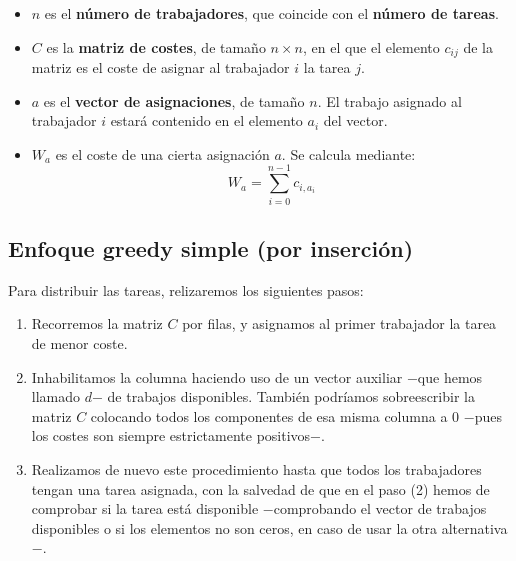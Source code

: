 \documentclass[10pt, a4paper]{article}
\theoremstyle{theorem-style}
\theoremstyle{theorem-style}
\theoremstyle{definition-style}
\theoremstyle{remark-style}
\theoremstyle{example-style}
\theoremstyle{definition-style}
\theoremstyle{remark-style}
\begin{document}
\begin{itemize}
	\item $n$ es el \textbf{número de trabajadores}, que coincide con el \textbf{número de tareas}.
	\item $C$ es la \textbf{matriz de costes}, de tamaño $n\times n$, en el que el elemento $c_{ij}$ de la matriz es el coste de asignar al trabajador $i$ la tarea $j$.
	\item $a$ es el \textbf{vector de asignaciones}, de tamaño $n$. El trabajo asignado al trabajador $i$ estará contenido en el elemento $a_i$ del vector.
	\item $W_a$ es el coste de una cierta asignación $a$. Se calcula mediante:
	$$ W_a = \sum_{i=0}^{n-1} c_{i,a_i}$$
\end{itemize}

\subsection{Enfoque greedy simple (por inserción)}

Para distribuir las tareas, relizaremos los siguientes pasos:
\begin{enumerate}
	\item Recorremos la matriz $C$ por filas, y asignamos al primer trabajador la tarea de menor coste.
	\item Inhabilitamos la columna haciendo uso de un vector auxiliar $-$que hemos llamado $d$$-$ de trabajos disponibles. También podríamos sobreescribir la matriz $C$ colocando todos los componentes de esa misma columna a 0 $-$pues los costes son siempre estrictamente positivos$-$.
	\item Realizamos de nuevo este procedimiento hasta que todos los trabajadores tengan una tarea asignada, con la salvedad de que en el paso (2) hemos de comprobar si la tarea está disponible $-$comprobando el vector de trabajos disponibles o si los elementos no son ceros, en caso de usar la otra alternativa$-$.
\end{enumerate}

\pagebreak
\end{document}
